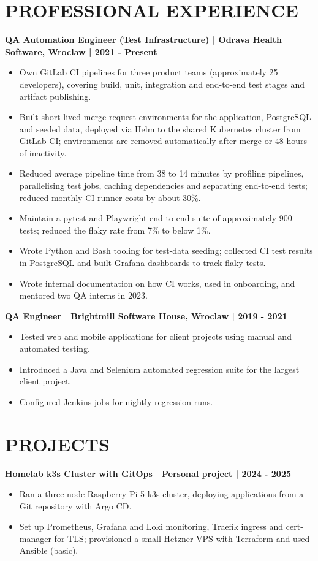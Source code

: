 \documentclass[11pt,a4paper]{article}
\begin{document}
\section*{PROFESSIONAL EXPERIENCE}
\textbf{QA Automation Engineer (Test Infrastructure) | Odrava Health Software, Wroclaw | 2021 - Present}
\begin{itemize}
\item Own GitLab CI pipelines for three product teams (approximately 25 developers), covering build, unit, integration and end-to-end test stages and artifact publishing.
\item Built short-lived merge-request environments for the application, PostgreSQL and seeded data, deployed via Helm to the shared Kubernetes cluster from GitLab CI; environments are removed automatically after merge or 48 hours of inactivity.
\item Reduced average pipeline time from 38 to 14 minutes by profiling pipelines, parallelising test jobs, caching dependencies and separating end-to-end tests; reduced monthly CI runner costs by about 30\%.
\item Maintain a pytest and Playwright end-to-end suite of approximately 900 tests; reduced the flaky rate from 7\% to below 1\%.
\item Wrote Python and Bash tooling for test-data seeding; collected CI test results in PostgreSQL and built Grafana dashboards to track flaky tests.
\item Wrote internal documentation on how CI works, used in onboarding, and mentored two QA interns in 2023.
\end{itemize}

\textbf{QA Engineer | Brightmill Software House, Wroclaw | 2019 - 2021}
\begin{itemize}
\item Tested web and mobile applications for client projects using manual and automated testing.
\item Introduced a Java and Selenium automated regression suite for the largest client project.
\item Configured Jenkins jobs for nightly regression runs.
\end{itemize}

\section*{PROJECTS}
\textbf{Homelab k3s Cluster with GitOps | Personal project | 2024 - 2025}
\begin{itemize}
\item Ran a three-node Raspberry Pi 5 k3s cluster, deploying applications from a Git repository with Argo CD.
\item Set up Prometheus, Grafana and Loki monitoring, Traefik ingress and cert-manager for TLS; provisioned a small Hetzner VPS with Terraform and used Ansible (basic).
\end{itemize}
\end{document}
